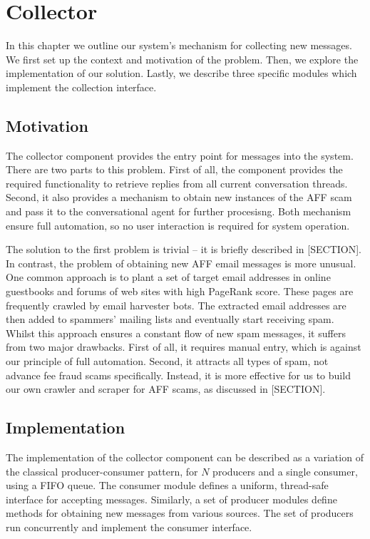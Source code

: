 \chapter{Collector}
In this chapter we outline our system's mechanism for collecting new messages. We first set up the context and motivation of the problem. Then, we explore the implementation of our solution. Lastly, we describe three specific modules which implement the collection interface.

\section{Motivation}

The collector component provides the entry point for messages into the system. There are two parts to this problem. First of all, the component provides the required functionality to retrieve replies from all current conversation threads. Second, it also provides a mechanism to obtain new instances of the AFF scam and pass it to the conversational agent for further procesisng. Both mechanism ensure full automation, so no user interaction is required for system operation.

The solution to the first problem is trivial -- it is briefly described in [SECTION]. In contrast, the problem of obtaining new AFF email messages is more unusual. One common approach is to plant a set of target email addresses in online guestbooks and forums of web sites with high PageRank score. These pages are frequently crawled by email harvester bots. The extracted email addresses are then added to spammers' mailing lists and eventually start receiving spam. Whilst this approach ensures a constant flow of new spam messages, it suffers from two major drawbacks. First of all, it requires manual entry, which is against our principle of full automation. Second, it attracts all types of spam, not advance fee fraud scams specifically. Instead, it is more effective for us to build our own crawler and scraper for AFF scams, as discussed in [SECTION].

\section{Implementation}

The implementation of the collector component can be described as a variation of the classical producer-consumer pattern, for $N$ producers and a single consumer, using a FIFO queue. The consumer module defines a uniform, thread-safe interface for accepting messages. Similarly, a set of producer modules define methods for obtaining new messages from various sources. The set of producers run concurrently and implement the consumer interface.

